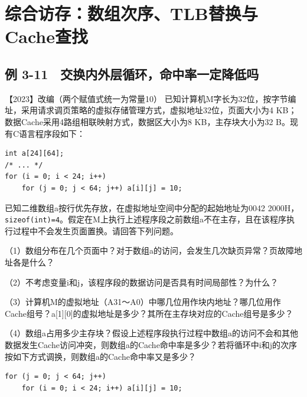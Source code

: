 \section{综合访存：数组次序、TLB替换与Cache查找}\label{co-memory-synthesis}

\subsection{例 3-11　交换内外层循环，命中率一定降低吗}\label{co-ex3-11}

\noindent{}【2023】改编（两个赋值式统一为常量10） 已知计算机M字长为32位，按字节编址，采用请求调页策略的虚拟存储管理方式，虚拟地址32位，页面大小为4 KB；数据Cache采用4路组相联映射方式，数据区大小为8 KB，主存块大小为32 B。现有C语言程序段如下：

\par\medskip\noindent
\begin{minipage}{\linewidth}
\begin{verbatim}
int a[24][64];
/* ... */
for (i = 0; i < 24; i++)
    for (j = 0; j < 64; j++) a[i][j] = 10;
\end{verbatim}
\end{minipage}\par\medskip

已知二维数组a按行优先存放，在虚拟地址空间中分配的起始地址为0042 2000H，\allowbreak{}\texttt{sizeof(int)=4}。假定在M上执行上述程序段之前数组a不在主存，且在该程序执行过程中不会发生页面置换。请回答下列问题。

（1）数组分布在几个页面中？对于数组a的访问，会发生几次缺页异常？页故障地址各是什么？

（2）不考虑变量i和j，该程序段的数据访问是否具有时间局部性？为什么？

（3）计算机M的虚拟地址（A31～A0）中哪几位用作块内地址？哪几位用作Cache组号？a{[}1{]}{[}0{]}的虚拟地址是多少？其所在主存块对应的Cache组号是多少？

（4）数组a占用多少主存块？假设上述程序段执行过程中数组a的访问不会和其他数据发生Cache访问冲突，则数组a的Cache命中率是多少？若将循环中i和j的次序按如下方式调换，则数组a的Cache命中率又是多少？

\par\medskip\noindent
\begin{minipage}{\linewidth}
\begin{verbatim}
for (j = 0; j < 64; j++)
    for (i = 0; i < 24; i++) a[i][j] = 10;
\end{verbatim}
\end{minipage}\par\medskip

